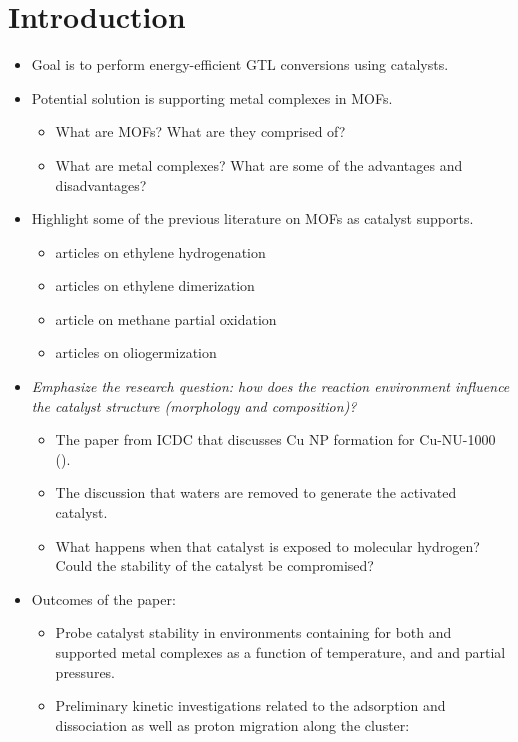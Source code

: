 \documentclass[journal=jctcce,manuscript=article]{achemso}
\begin{document}
\section{Introduction}
\begin{itemize}
    \item Goal is to perform energy-efficient GTL conversions using catalysts. 
    \item Potential solution is supporting metal complexes in MOFs.
    \begin{itemize}
        \item What are MOFs? What are they comprised of?
        \item What are metal complexes? What are some of the advantages and disadvantages? 
    \end{itemize}
    \item Highlight some of the previous literature on MOFs as catalyst supports. 
    \begin{itemize}
        \item articles on ethylene hydrogenation
        \item articles on ethylene dimerization 
        \item article on methane partial oxidation
        \item articles on oliogermization 
    \end{itemize}
    \item \emph{Emphasize the research question: how does the reaction environment influence the catalyst structure (morphology and composition)?}
    \begin{itemize}
        \item The paper from ICDC that discusses Cu NP formation for Cu-NU-1000 (\citeauthor{Halder2020}).
        \item The discussion that waters are removed to generate the activated catalyst. 
        \item What happens when that catalyst is exposed to molecular hydrogen? Could the stability of the catalyst be compromised?
    \end{itemize}
    \item Outcomes of the paper:
    \begin{itemize}
        \item Probe catalyst stability in environments containing  for both  and  supported metal complexes as a function of temperature, and  and  partial pressures. 
        \item Preliminary kinetic investigations related to the  adsorption and dissociation as well as proton migration along the cluster: 

\end{itemize}
\end{itemize}
\end{document}
